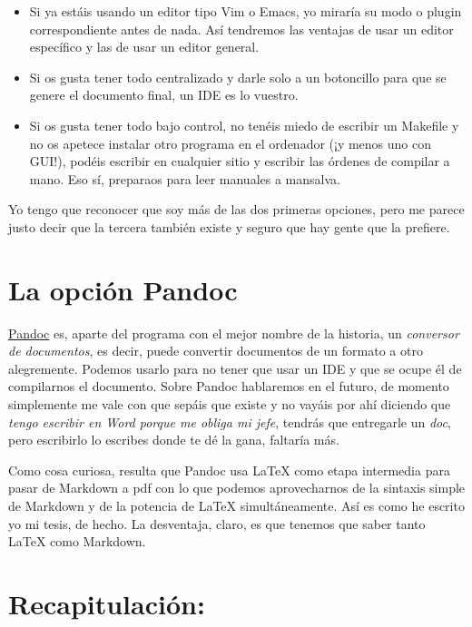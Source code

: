 \begin{itemize}
\item
  Si ya estáis usando un editor tipo Vim o Emacs, yo miraría su modo o
  plugin correspondiente antes de nada. Así tendremos las ventajas de
  usar un editor específico y las de usar un editor general.
\item
  Si os gusta tener todo centralizado y darle solo a un botoncillo para
  que se genere el documento final, un IDE es lo vuestro.
\item
  Si os gusta tener todo bajo control, no tenéis miedo de escribir un
  Makefile y no os apetece instalar otro programa en el ordenador (¡y
  menos uno con GUI!), podéis escribir en cualquier sitio y escribir las
  órdenes de compilar a mano. Eso sí, preparaos para leer manuales a
  mansalva.
\end{itemize}

Yo tengo que reconocer que soy más de las dos primeras opciones, pero me
parece justo decir que la tercera también existe y seguro que hay gente
que la prefiere.

\section{La opción Pandoc}\label{la-opciuxf3n-pandoc}

\href{http://pandoc.org/}{Pandoc} es, aparte del programa con el mejor
nombre de la historia, un \emph{conversor de documentos}, es decir,
puede convertir documentos de un formato a otro alegremente. Podemos
usarlo para no tener que usar un IDE y que se ocupe él de compilarnos el
documento. Sobre Pandoc hablaremos en el futuro, de momento simplemente
me vale con que sepáis que existe y no vayáis por ahí diciendo que
\emph{tengo escribir en Word porque me obliga mi jefe}, tendrás que
entregarle un \emph{doc}, pero escribirlo lo escribes donde te dé la
gana, faltaría más.

Como cosa curiosa, resulta que Pandoc usa LaTeX como etapa intermedia
para pasar de Markdown a pdf con lo que podemos aprovecharnos de la
sintaxis simple de Markdown y de la potencia de LaTeX simultáneamente.
Así es como he escrito yo mi tesis, de hecho. La desventaja, claro, es
que tenemos que saber tanto LaTeX como Markdown.

\section{Recapitulación:}\label{recapitulaciuxf3n}

